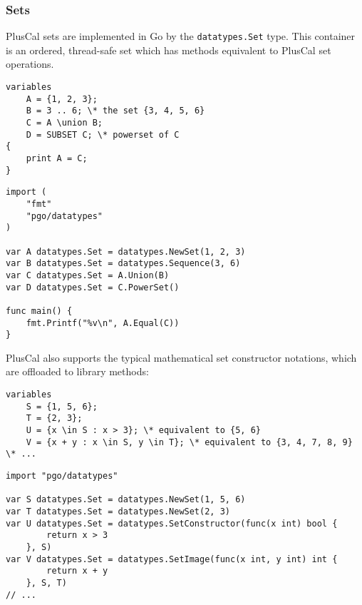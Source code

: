 \subsubsection{Sets}
\label{sec:sets}
PlusCal sets are implemented in Go by the \texttt{datatypes.Set} type. This container is an ordered, thread-safe set which has methods equivalent to PlusCal set operations.

\noindent
\begin{minipage}[t]{0.45\textwidth}
\begin{lstlisting}[language=pcal]
variables
	A = {1, 2, 3};
	B = 3 .. 6; \* the set {3, 4, 5, 6}
	C = A \union B;
	D = SUBSET C; \* powerset of C
{
	print A = C;
}
\end{lstlisting}
\end{minipage}
\hfill
\begin{minipage}[t]{0.45\textwidth}
\begin{lstlisting}[language=golang]
import (
	"fmt"
	"pgo/datatypes"
)

var A datatypes.Set = datatypes.NewSet(1, 2, 3)
var B datatypes.Set = datatypes.Sequence(3, 6)
var C datatypes.Set = A.Union(B)
var D datatypes.Set = C.PowerSet()

func main() {
	fmt.Printf("%v\n", A.Equal(C))
}
\end{lstlisting}
\end{minipage}

PlusCal also supports the typical mathematical set constructor notations, which are offloaded to library methods:

\noindent
\begin{minipage}[t]{\textwidth}
\begin{lstlisting}[language=pcal]
variables
	S = {1, 5, 6};
	T = {2, 3};
	U = {x \in S : x > 3}; \* equivalent to {5, 6}
	V = {x + y : x \in S, y \in T}; \* equivalent to {3, 4, 7, 8, 9}
\* ...
\end{lstlisting}
\end{minipage}

\noindent
\begin{minipage}[t]{\textwidth}
\begin{lstlisting}[language=golang]
import "pgo/datatypes"

var S datatypes.Set = datatypes.NewSet(1, 5, 6)
var T datatypes.Set = datatypes.NewSet(2, 3)
var U datatypes.Set = datatypes.SetConstructor(func(x int) bool {
		return x > 3
	}, S)
var V datatypes.Set = datatypes.SetImage(func(x int, y int) int {
		return x + y
	}, S, T)
// ...
\end{lstlisting}
\end{minipage}

